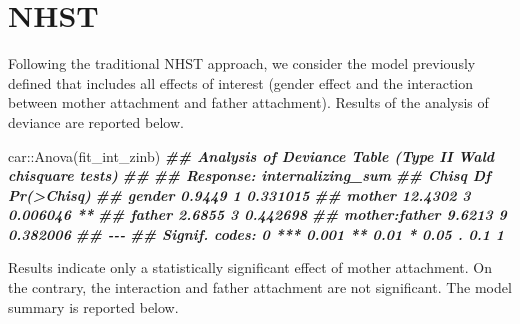 \documentclass[
]{book}
\newenvironment{Shaded}{\begin{snugshade}}{\end{snugshade}}
\newcommand{\DocumentationTok}[1]{\textcolor[rgb]{0.56,0.35,0.01}{\textbf{\textit{#1}}}}
\newcommand{\FunctionTok}[1]{\textcolor[rgb]{0.00,0.00,0.00}{#1}}
\newcommand{\NormalTok}[1]{#1}
\newcommand{\SpecialCharTok}[1]{\textcolor[rgb]{0.00,0.00,0.00}{#1}}
\begin{document}
\hypertarget{nhst-int}{%
\chapter{NHST}\label{nhst-int}}

Following the traditional NHST approach, we consider the model previously defined that includes all effects of interest (gender effect and the interaction between mother attachment and father attachment). Results of the analysis of deviance are reported below.

\begin{Shaded}
\begin{Highlighting}[]
\NormalTok{car}\SpecialCharTok{::}\FunctionTok{Anova}\NormalTok{(fit\_int\_zinb)}
\DocumentationTok{\#\# Analysis of Deviance Table (Type II Wald chisquare tests)}
\DocumentationTok{\#\# }
\DocumentationTok{\#\# Response: internalizing\_sum}
\DocumentationTok{\#\#                 Chisq Df Pr(\textgreater{}Chisq)   }
\DocumentationTok{\#\# gender         0.9449  1   0.331015   }
\DocumentationTok{\#\# mother        12.4302  3   0.006046 **}
\DocumentationTok{\#\# father         2.6855  3   0.442698   }
\DocumentationTok{\#\# mother:father  9.6213  9   0.382006   }
\DocumentationTok{\#\# {-}{-}{-}}
\DocumentationTok{\#\# Signif. codes:  0 \textquotesingle{}***\textquotesingle{} 0.001 \textquotesingle{}**\textquotesingle{} 0.01 \textquotesingle{}*\textquotesingle{} 0.05 \textquotesingle{}.\textquotesingle{} 0.1 \textquotesingle{} \textquotesingle{} 1}
\end{Highlighting}
\end{Shaded}

Results indicate only a statistically significant effect of mother attachment. On the contrary, the interaction and father attachment are not significant. The model summary is reported below.
\end{document}
